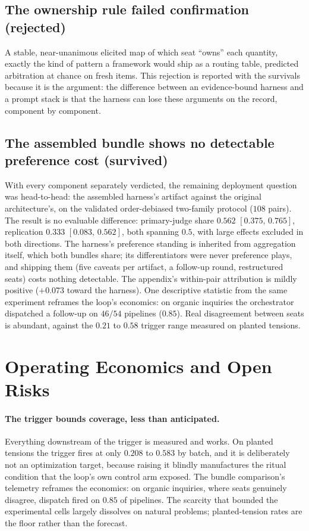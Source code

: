 \documentclass[11pt]{article}
\newcommand{\ci}[2]{\ensuremath{[#1,\,#2]}}
\begin{document}
\subsection{The ownership rule failed confirmation (rejected)}

A stable, near-unanimous elicited map of which seat ``owns'' each
quantity, exactly the kind of pattern a framework would ship as a
routing table, predicted arbitration at chance on fresh items. This
rejection is reported with the survivals because it is the argument:
the difference between an evidence-bound harness and a prompt stack is
that the harness can lose these arguments on the record, component by
component.

\subsection{The assembled bundle shows no detectable preference cost
(survived)}

With every component separately verdicted, the remaining deployment
question was head-to-head: the assembled harness's artifact against the
original architecture's, on the validated order-debiased two-family
protocol ($108$ pairs). The result is no evaluable difference:
primary-judge share $0.562$ \ci{0.375}{0.765}, replication $0.333$
\ci{0.083}{0.562}, both spanning $0.5$, with large effects excluded in
both directions. The harness's preference standing is inherited from
aggregation itself, which both bundles share; its differentiators were
never preference plays, and shipping them (five caveats per artifact, a
follow-up round, restructured seats) costs nothing detectable. The
appendix's within-pair attribution is mildly positive ($+0.073$ toward
the harness). One descriptive statistic from the same experiment
reframes the loop's economics: on organic inquiries the orchestrator
dispatched a follow-up on $46/54$ pipelines ($0.85$). Real disagreement
between seats is abundant, against the $0.21$ to $0.58$ trigger range
measured on planted tensions.

\section{Operating Economics and Open Risks}
\label{sec:economics}

\paragraph{The trigger bounds coverage, less than anticipated.}
Everything downstream of the trigger is measured and works. On planted
tensions the trigger fires at only $0.208$ to $0.583$ by batch, and it
is deliberately not an optimization target, because raising it blindly
manufactures the ritual condition that the loop's own control arm
exposed. The bundle comparison's telemetry reframes the economics: on
organic inquiries, where seats genuinely disagree, dispatch fired on
$0.85$ of pipelines. The scarcity that bounded the experimental cells
largely dissolves on natural problems; planted-tension rates are the
floor rather than the forecast.
\end{document}
